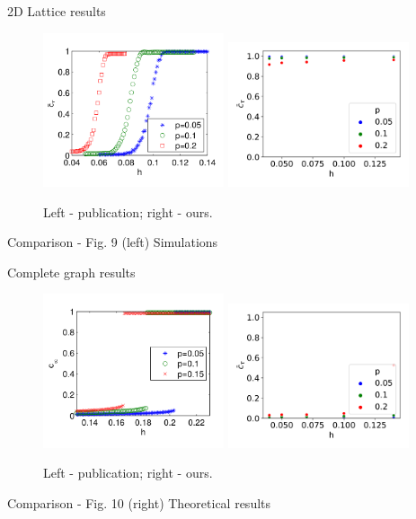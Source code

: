 \documentclass[10pt]{beamer}
\begin{document}
\begin{frame}{2D Lattice results}
	\begin{figure}
		\includegraphics[width=0.475\textwidth]{../resources/images/fig9-left.png}
		\hfill
		\includegraphics[width=0.475\textwidth]{../results/images/hp-lattice.png}
		\caption{Left - publication; right - ours.}
	\end{figure}
	Comparison - Fig. 9 (left)
	Simulations
\end{frame}

\begin{frame}{Complete graph results}
	\begin{figure}
		\includegraphics[width=0.475\textwidth]{../resources/images/fig10-right.png}
		\hfill
		\includegraphics[width=0.475\textwidth]{../results/images/hp-complete.png}
		\caption{Left - publication; right - ours.}
	\end{figure}
	Comparison - Fig. 10 (right)
	Theoretical results
\end{frame}
\end{document}
